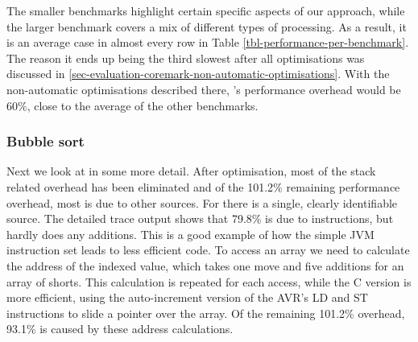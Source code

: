 The smaller benchmarks highlight certain specific aspects of our approach, while the larger  benchmark covers a mix of different types of processing. As a result, it is an average case in almost every row in Table \ref{tbl-performance-per-benchmark}. The reason it ends up being the third slowest after all optimisations was discussed in \ref{sec-evaluation-coremark-non-automatic-optimisations}. With the non-automatic optimisations described there, 's performance overhead would be 60\%, close to the average of the other benchmarks.

\subsubsection{Bubble sort}
\label{sec-evaluation-bubble-sort}
Next we look at  in some more detail. After optimisation, most of the stack related overhead has been eliminated and of the 101.2\% remaining performance overhead, most is due to other sources. For  there is a single, clearly identifiable source. The detailed trace output shows that 79.8\% is due to  instructions, but  hardly does any additions. This is a good example of how the simple JVM instruction set leads to less efficient code. To access an array we need to calculate the address of the indexed value, which takes one move and five additions for an array of shorts. This calculation is repeated for each access, while the C version is more efficient, using the auto-increment version of the AVR's LD and ST instructions to slide a pointer over the array. Of the remaining 101.2\% overhead, 93.1\% is caused by these address calculations.

%

